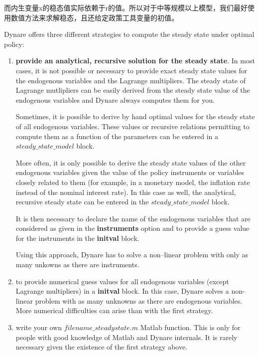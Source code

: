 \documentclass[cn,10pt,math=newtx,citestyle=gb7714-2015,bibstyle=gb7714-2015]{elegantbook}
\begin{document}
	而内生变量x的稳态值实际依赖于r的值。所以对于中等规模以上模型，我们最好使用数值方法来求解稳态，且还给定政策工具变量的初值。
	
	Dynare offers three different strategies to compute the steady state under optimal policy:
	
	\begin{enumerate}
		\item \textbf{provide an analytical, recursive solution for the steady state}. In most cases, it is not possible or necessary to provide exact steady state values for the endogenous variables and the Lagrange multipliers. The steady state of Lagrange mutlipliers can be easily derived from the steady state value of the endogenous variables and Dynare always computes them for you.
		
		Sometimes, it is possible to derive by hand optimal values for the steady state of all endogenous variables. These values or recursive relations permitting to compute them as a function of the parameters can be entered in a $steady\_state\_ model$ block.
		
		More often, it is only possible to derive the steady state values of the other endogenous variables given the value of the policy instruments or variables closely related to them (for example, in a monetary model, the inflation rate instead of the nominal interest rate). In this case as well, the analytical, recursive steady state can be entered in the $steady\_state\_ model$ block.
		
		It is then necessary to declare the name of the endogenous variables that are considered as given in the \textbf{instruments} option and to provide a guess value for the instruments in the \textbf{initval} block. 
		
		Using this approach, Dynare has to solve a non–linear problem with only as many unkowns as there are instruments.
		\item to provide numerical guess values for all endogenous variables (except Lagrange multipliers) in a \textbf{initval} block. In this case, Dynare solves a non-linear problem with as many unknowns as there are endogenous variables. More numerical difficulties can arise than with the first strategy.
		\item write your own $filename\_steadystate.m$ Matlab function. This is only for people with good knowledge of Matlab and Dynare internals. It is rarely necessary given the existence of the first strategy above.
	\end{enumerate}
	
\end{document}
